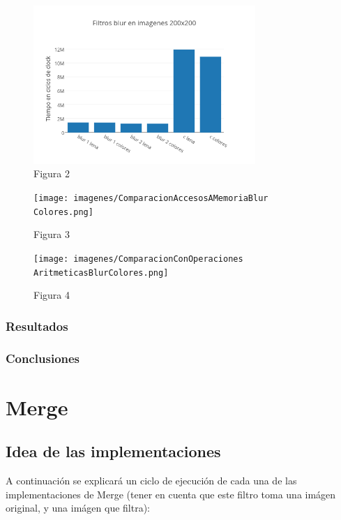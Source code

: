 \documentclass[a4paper]{article}
\begin{document}
\begin{figure}[h]
  \centering
    \includegraphics[width=0.75\textwidth]{imagenes/Filtros blur en imagenes 200x200.png}
  \caption{Figura 2}
  \label{fig:graficoblur2}
\end{figure}
 \FloatBarrier

\begin{figure}[h]
  \centering
    \texttt{[image: imagenes/ComparacionAccesosAMemoriaBlur Colores.png]}
  \caption{Figura 3}
  \label{fig:graficoblur3}
\end{figure}
 \FloatBarrier

\begin{figure}[h]
  \centering
    \texttt{[image: imagenes/ComparacionConOperaciones AritmeticasBlurColores.png]}
  \caption{Figura 4}
  \label{fig:graficoblur4}
\end{figure}
 \FloatBarrier


\subsubsection{Resultados}


\subsubsection{Conclusiones}


\newpage
\section{Merge}

\subsection{Idea de las implementaciones}
A continuación se explicará un ciclo de ejecución de cada una de las implementaciones de Merge (tener en cuenta que este filtro toma una imágen original, y una imágen que filtra):
\end{document}

